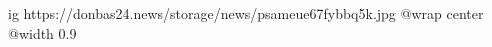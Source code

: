  
 
 
 
 

\ifcmt
  ig https://donbas24.news/storage/news/psameue67fybbq5k.jpg
  @wrap center
  @width 0.9
\fi
